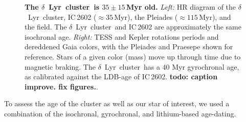 \documentclass[12pt,modern,twocolumn,tighten]{aastex63}
\newcommand{\cn}{$\delta$~Lyr\ cluster} %
\begin{document}
\begin{figure}[t]
	\begin{center}
		\leavevmode
	\end{center}
	\vspace{-0.7cm}
	\caption{
    {\bf The \cn\ is $35\pm15$\,Myr old.}  {\it Left:} HR diagram of 
    the \cn, IC\,2602 ($\approx35$\,Myr), the Pleiades ($\approx 115$\,Myr), and the field.
    The \cn\ and IC\,2602 are approximately the same isochronal age.
    {\it Right:} TESS and Kepler rotations periods and dereddened Gaia
    colors, with the Pleiades
    \citep[125\,Myr;][]{rebull_rotation_2016a} and Praesepe
    \citep[650\,Myr;][]{douglas_poking_2017} shown for reference.
    Stars of a given color (mass) move up through time due to magnetic
    braking.  The \cn\ has a 40 Myr gyrochronal age, as calibrated
    against the LDB-age of IC\,2602.  {\bf todo: caption improve. fix
    figures.}.
   \label{fig:age}
	}
\end{figure}

To assess the age of the cluster as well as our star of interest,
we used a combination of the isochronal, gyrochronal, and
lithium-based age-dating.
\end{document}
